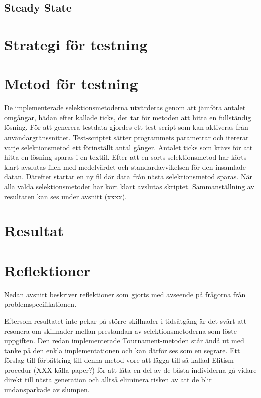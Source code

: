 \documentclass[titlepage, a4paper, 12pt]{article}
\begin{document}
\begin{itemize}
  \subsection{Steady State}
  
\section{Strategi för testning}

\section{Metod för testning}
De implementerade selektionsmetoderna utvärderas genom att jämföra antalet omgångar, hädan efter kallade ticks, det tar för metoden att hitta en fullständig lösning. För att generera testdata gjordes ett test-script som kan aktiveras från användargränssnittet. Test-scriptet sätter programmets parametrar och itererar varje selektionsmetod ett förinställt antal gånger. Antalet ticks som krävs för att hitta en lösning sparas i en textfil. Efter att en sorts selektionsmetod har körts klart avslutas filen med medelvärdet och standardavvikelsen för den insamlade datan. Därefter startar en ny fil där data från nästa selektionsmetod sparas. När alla valda selektionsmetoder har kört klart avslutas skriptet. Sammanställning av resultaten kan ses under avsnitt (xxxx). 
\section{Resultat}

\section{Reflektioner}\label{sec:reflektioner}

Nedan avsnitt beskriver reflektioner som gjorts med avseende på
frågorna från problemspecifikationen.

Eftersom resultatet inte pekar på större skillnader i tidsåtgång är det svårt att resonera om skillnader mellan prestandan av selektionsmetoderna som löste uppgiften. Den redan implementerade Tournament-metoden står ändå ut med tanke på den enkla implementationen och kan därför ses som en segrare. Ett förslag till förbättring till denna metod vore att lägga till så kallad Elitism-procedur (XXX källa paper?) för att låta en del av de bästa individerna gå vidare direkt till nästa generation och alltså eliminera risken av att de blir undansparkade av slumpen.
    

\end{itemize}
\end{document}
